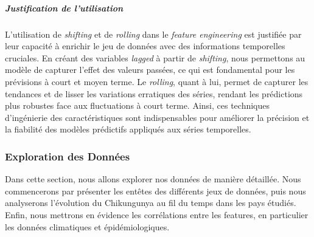 \subparagraph{Justification de l'utilisation}

L'utilisation de \textit{shifting} et de \textit{rolling} dans le \textit{feature engineering} est justifiée par leur capacité à enrichir le jeu de données avec des informations temporelles cruciales. En créant des variables \textit{lagged} à partir de \textit{shifting}, nous permettons au modèle de capturer l'effet des valeurs passées, ce qui est fondamental pour les prévisions à court et moyen terme. Le \textit{rolling}, quant à lui, permet de capturer les tendances et de lisser les variations erratiques des séries, rendant les prédictions plus robustes face aux fluctuations à court terme. Ainsi, ces techniques d'ingénierie des caractéristiques sont indispensables pour améliorer la précision et la fiabilité des modèles prédictifs appliqués aux séries temporelles.

\subsubsection{Exploration des Données}
Dans cette section, nous allons explorer nos données de manière détaillée. Nous commencerons par présenter les entêtes des différents jeux de données, puis nous analyserons l'évolution du Chikungunya au fil du temps dans les pays étudiés. Enfin, nous mettrons en évidence les corrélations entre les features, en particulier les données climatiques et épidémiologiques.

